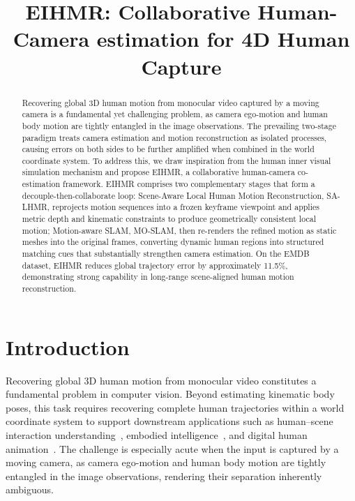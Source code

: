 


\title{EIHMR: Collaborative Human-Camera estimation for 4D Human Capture}



\begin{abstract}
Recovering global 3D human motion from monocular video captured by a moving camera is a fundamental yet challenging problem, as camera ego-motion and human body motion are tightly entangled in the image observations. The prevailing two-stage paradigm treats camera estimation and motion reconstruction as isolated processes, causing errors on both sides to be further amplified when combined in the world coordinate system. To address this, we draw inspiration from the human inner visual simulation mechanism and propose EIHMR, a collaborative human-camera co-estimation framework. EIHMR comprises two complementary stages that form a decouple-then-collaborate loop: Scene-Aware Local Human Motion Reconstruction, SA-LHMR, reprojects motion sequences into a frozen keyframe viewpoint and applies metric depth and kinematic constraints to produce geometrically consistent local motion; Motion-aware SLAM, MO-SLAM, then re-renders the refined motion as static meshes into the original frames, converting dynamic human regions into structured matching cues that substantially strengthen camera estimation. On the EMDB dataset, EIHMR reduces global trajectory error by approximately 11.5\%, demonstrating strong capability in long-range scene-aligned human motion reconstruction.
\end{abstract}


\section{Introduction}
\label{sec:intro}
Recovering global 3D human motion from monocular video constitutes a fundamental problem in computer vision. Beyond estimating kinematic body poses, this task requires recovering complete human trajectories within a world coordinate system to support downstream applications such as human--scene interaction understanding~\cite{Hassan2019,RICH2022}, embodied intelligence~\cite{Embodied2022,EmbodiedScan2024}, and digital human animation~\cite{DigitalHuman2024}. The challenge is especially acute when the input is captured by a moving camera, as camera ego-motion and human body motion are tightly entangled in the image observations, rendering their separation inherently ambiguous.

